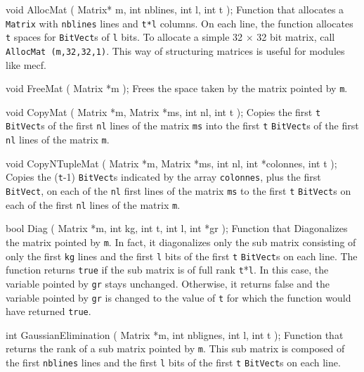\code


void AllocMat ( Matrix* m,
                int nblines,
                int l,
                int t
              );
\endcode
 \tab
Function that allocates a {\tt Matrix} with {\tt nblines} lines and {\tt t*l} columns.
On each line, the function allocates {\tt t} spaces for {\tt BitVect}s of {\tt l} bits.
To allocate a simple 32 $\times$ 32 bit matrix, call
{\tt AllocMat (m,32,32,1)}.  This way of structuring matrices is useful for modules like mecf.
 \endtab

\code


void FreeMat ( Matrix *m
             );
\endcode
 \tab
Frees the space taken by the matrix pointed by {\tt m}.
 \endtab

\code


void CopyMat ( Matrix *m,
               Matrix *ms,
               int nl,
               int t
             );
\endcode
 \tab
Copies the first {\tt t} {\tt BitVect}s of the first {\tt nl} lines of the matrix {\tt ms} into the
first {\tt t} {\tt BitVect}s of the first {\tt nl} lines of the matrix {\tt m}.
 \endtab

\code


void CopyNTupleMat ( Matrix *m,
                     Matrix *ms,
                     int nl,
                     int *colonnes,
                     int t
                   );
\endcode
 \tab
Copies the ({\tt t}-1) {\tt BitVect}s indicated by the array {\tt colonnes}, plus the first {\tt BitVect}, on each of the
{\tt nl} first lines of the matrix {\tt ms} to the first {\tt t} {\tt BitVect}s on each of the first {\tt nl}
lines of the matrix {\tt m}.
 \endtab
\code


bool Diag ( Matrix *m,
               int kg,
               int t,
               int l,
               int *gr
             );
\endcode
 \tab
Function that Diagonalizes the matrix pointed by {\tt m}.  In fact, it diagonalizes only the sub matrix consisting
of only the first {\tt kg} lines and the first {\tt l} bits of the first {\tt t} {\tt BitVect}s on each line.
The function returns {\tt true} if the sub matrix is of full rank {\tt t}*{\tt l}.  In this case, the variable pointed by {\tt gr}
stays unchanged.  Otherwise, it returns false and the variable pointed by {\tt gr} is changed to the value of {\tt t} for which
the function would have returned {\tt true}.
 \endtab

\code


int GaussianElimination ( Matrix *m,
                          int nblignes,
                          int l,
                          int t
                        );
\endcode
 \tab
Function that returns the rank of a sub matrix pointed by {\tt m}.  This sub matrix is
composed of the first {\tt nblines} lines and the first {\tt l} bits of the first {\tt t} {\tt BitVect}s on each line.
 \endtab

